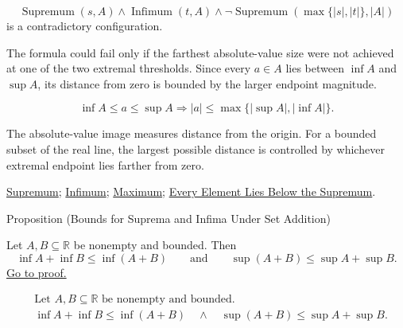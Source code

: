 \begin{remark*}
\[
\operatorname{Supremum}(s,A)\land \operatorname{Infimum}(t,A)
\land
\neg\operatorname{Supremum}(\max\{|s|,|t|\},|A|)
\]
is a contradictory configuration.
\end{remark*}

\begin{remark*}
The formula could fail only if the farthest absolute-value size were not achieved at one of the two extremal thresholds. Since every $a\in A$ lies between $\inf A$ and $\sup A$, its distance from zero is bounded by the larger endpoint magnitude.
\end{remark*}

\begin{remark*}
\[
\inf A\le a\le \sup A
\Longrightarrow
|a|\le \max\{|\sup A|,|\inf A|\}.
\]
\end{remark*}

\begin{remark*}[Interpretation]
The absolute-value image measures distance from the origin. For a bounded subset of the real line, the largest possible distance is controlled by whichever extremal endpoint lies farther from zero.
\end{remark*}

\begin{dependencies}
\hyperref[def:supremum]{Supremum};
\hyperref[def:infimum]{Infimum};
\hyperref[def:maximum]{Maximum};
\hyperref[prop:every-element-lies-below-the-supremum]{Every Element Lies Below the Supremum}.
\end{dependencies}



\begin{propositionbox}{Proposition (Bounds for Suprema and Infima Under Set Addition)}
\begin{proposition}
\label{prop:bounds-sum-set}
Let $A,B\subseteq\mathbb{R}$ be nonempty and bounded. Then
\[
  \inf A+\inf B\le \inf(A+B)
  \qquad\text{and}\qquad
  \sup(A+B)\le \sup A+\sup B.
\]
\hyperref[prf:bounds-sum-set]{Go to proof.}
\end{proposition}
\end{propositionbox}

\begin{remark*}
\[
\begin{aligned}
&\text{Let }A,B\subseteq\mathbb{R}\text{ be nonempty and bounded.}\\
&\inf A+\inf B\le \inf(A+B)
\quad\land\quad
\sup(A+B)\le \sup A+\sup B.
\end{aligned}
\]
\end{remark*}

